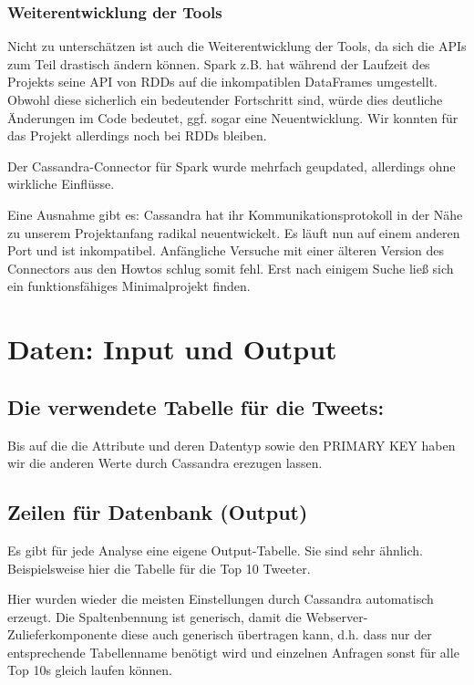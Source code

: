 \subsubsection{Weiterentwicklung der Tools}
Nicht zu unterschätzen ist auch die Weiterentwicklung der Tools, da sich
die APIs zum Teil drastisch ändern können. Spark z.B. hat während der
Laufzeit des Projekts seine API von RDDs auf die inkompatiblen
DataFrames umgestellt. Obwohl diese sicherlich ein bedeutender
Fortschritt sind, würde dies deutliche Änderungen im Code bedeutet,
ggf. sogar eine Neuentwicklung. Wir konnten für das Projekt allerdings
noch bei RDDs bleiben.

Der Cassandra-Connector für Spark wurde mehrfach geupdated, allerdings
ohne wirkliche Einflüsse.

Eine Ausnahme gibt es: Cassandra hat ihr Kommunikationsprotokoll in der
Nähe zu unserem Projektanfang radikal neuentwickelt. Es läuft nun auf
einem anderen Port und ist inkompatibel. Anfängliche Versuche mit einer
älteren Version des Connectors aus den Howtos schlug somit fehl. Erst
nach einigem Suche ließ sich ein funktionsfähiges Minimalprojekt
finden.

\section{Daten: Input
und Output}
\subsection{Die verwendete Tabelle für die
Tweets:}


\bigskip


\bigskip

Bis auf die die Attribute und deren Datentyp sowie den PRIMARY KEY haben
wir die anderen Werte durch Cassandra erezugen lassen.

\subsection{Zeilen für Datenbank (Output)}
Es gibt für jede Analyse eine eigene Output-Tabelle. Sie sind sehr
ähnlich. Beispielsweise hier die Tabelle für die Top 10 Tweeter.



\bigskip

Hier wurden wieder die meisten Einstellungen durch Cassandra automatisch
erzeugt. Die Spaltenbennung ist generisch, damit die
Webserver-Zulieferkomponente diese auch generisch übertragen kann, d.h.
dass nur der entsprechende Tabellenname benötigt wird und einzelnen
Anfragen sonst für alle Top 10s gleich laufen können.

